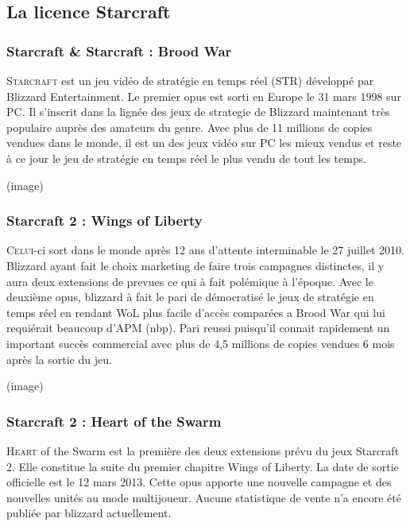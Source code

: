 \subsection{La licence Starcraft}%
\label{sub:la_licence_starcraft}

\subsubsection{Starcraft \& Starcraft : Brood War}%
\label{ssub:starcraft_&_starcraft_brood_war}

\lettrine{S}{tarcraft} est un jeu vidéo de stratégie en temps réel (STR) développé
par Blizzard Entertainment. Le premier opus est sorti en Europe le 31
mars 1998 sur PC. Il s'inscrit dans la lignée des jeux de strategie de
Blizzard maintenant très populaire auprès des amateurs du genre. Avec
plus de 11 millions de copies vendues dans le monde, il est un des
jeux vidéo sur PC les mieux vendus et reste à ce jour le jeu de
stratégie en temps réel le plus vendu de tout les temps.

(image)

\subsubsection{Starcraft 2 : Wings of Liberty}%
\label{ssub:starcraft_2_wings_of_liberty}

\lettrine{C}{elui}-ci sort dans le monde après 12 ans d'attente
interminable le 27 juillet 2010. Blizzard ayant fait le choix marketing
de faire trois campagnes distinctes, il y aura deux extensions de
prevues ce qui à fait polémique à l'époque. Avec le deuxième opus,
blizzard à fait le pari de démocratisé le jeux de stratégie en temps
réel en rendant WoL plus facile d'accès comparées a Brood War qui lui
requiérait beaucoup d'APM (nbp). Pari reussi puisqu'il connait
rapidement un important succès commercial avec plus de 4,5 millions de
copies vendues 6 mois après la sortie du jeu.

(image)

\subsubsection{Starcraft 2 : Heart of the Swarm}%
\label{ssub:starcraft_2_heart_of_the_swarm}

\lettrine{H}{eart} of the Swarm est la première des deux extensions prévu
du jeux Starcraft 2. Elle constitue la suite du premier chapitre Wings
of Liberty. La date de sortie officielle est le 12 mars 2013. Cette opus
apporte une nouvelle campagne et des nouvelles unités au mode
multijoueur. Aucune statistique de vente n'a encore été publiée par
blizzard actuellement.

